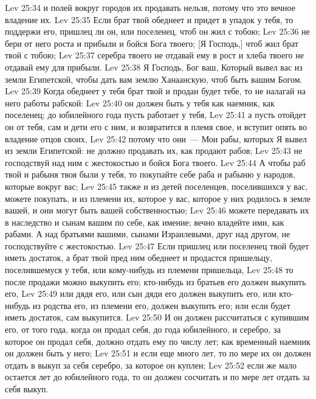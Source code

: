 \vs Lev 25:34 и полей вокруг городов их продавать нельзя, потому что это вечное владение их.
\vs Lev 25:35 Если брат твой обеднеет и придет в упадок у тебя, то поддержи его, пришлец ли он, или поселенец, чтоб он жил с тобою;
\vs Lev 25:36 не бери от него роста и прибыли и бойся Бога твоего; [Я Господь,] чтоб жил брат твой с тобою;
\vs Lev 25:37 серебра твоего не отдавай ему в рост и хлеба твоего не отдавай ему для  прибыли.
\vs Lev 25:38 Я Господь, Бог ваш, Который вывел вас из земли Египетской, чтобы дать вам землю Ханаанскую, чтоб быть вашим Богом.
\vs Lev 25:39 Когда обеднеет у тебя брат твой и продан будет тебе, то не налагай на него работы рабской:
\vs Lev 25:40 он должен быть у тебя как наемник, как поселенец; до юбилейного года пусть работает у тебя,
\vs Lev 25:41 а  пусть отойдет он от тебя, сам и дети его с ним, и возвратится в племя свое, и вступит опять во владение отцов своих,
\vs Lev 25:42 потому что они~--- Мои рабы, которых Я вывел из земли Египетской: не должно продавать их, как продают рабов;
\vs Lev 25:43 не господствуй над ним с жестокостью и бойся Бога твоего.
\vs Lev 25:44 А чтобы раб твой и рабыня твоя были у тебя, то покупайте себе раба и рабыню у народов, которые вокруг вас;
\vs Lev 25:45 также и из детей поселенцев, поселившихся у вас, можете покупать, и из племени их, которое у вас, которое у них родилось в земле вашей, и они могут быть вашей собственностью;
\vs Lev 25:46 можете передавать их в наследство и сынам вашим по себе, как имение; вечно владейте ими, как рабами. А над братьями вашими, сынами Израилевыми, друг над другом, не господствуйте с жестокостью.
\vs Lev 25:47 Если пришлец или поселенец твой будет иметь достаток, а брат твой пред ним обеднеет и продастся пришельцу, поселившемуся у тебя, или кому-нибудь из племени пришельца,
\vs Lev 25:48 то после продажи можно выкупить его; кто-нибудь из братьев его должен выкупить его,
\vs Lev 25:49 или дядя его, или сын дяди его должен выкупить его, или кто-нибудь из родства его, из племени его, должен выкупить его; или если будет иметь достаток, сам выкупится.
\vs Lev 25:50 И он должен рассчитаться с купившим его,  от того года, когда он продал себя, до года юбилейного, и серебро, за которое он продал себя, должно отдать ему по числу лет; как временный наемник он должен быть у него;
\vs Lev 25:51 и если еще много  лет, то по мере их он должен отдать в выкуп за себя серебро, за которое он куплен;
\vs Lev 25:52 если же мало остается лет до юбилейного года, то он должен сосчитать и по мере лет отдать за себя выкуп.
